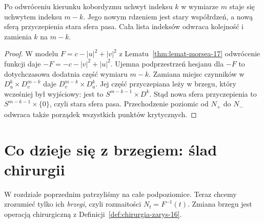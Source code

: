 \begin{twierdzenie}
\label{thm:dualny-uchwyt-18}
Po odwróceniu kierunku kobordyzmu uchwyt
indeksu $k$ w wymiarze $m$ staje się uchwytem
indeksu $m-k$. Jego nowym rdzeniem jest stary
współrdzeń, a nową sferą przyczepienia stara
sfera pasa. Cała lista indeksów odwraca kolejność
i zamienia $k$ na $m-k$.
\end{twierdzenie}
\begin{proof}
W modelu $F=c-|u|^2+|v|^2$ z
Lematu~\ref{thm:lemat-morsea-17}
odwrócenie funkcji daje
$-F=-c-|v|^2+|u|^2$.
Ujemna podprzestrzeń hesjanu dla $-F$
to dotychczasowa dodatnia część wymiaru
$m-k$. Zamiana miejsc czynników w
$D^k_u\times D^{m-k}_v$ daje
$D^{m-k}_v\times D^k_u$.
Jej część przyczepiana leży w brzegu,
który wcześniej był wyjściowy:
jest to $S^{m-k-1}\times D^k$.
Stąd nowa sfera przyczepienia to
$S^{m-k-1}\times\{0\}$, czyli stara
sfera pasa. Przechodzenie poziomic
od $N_+$ do $N_-$ odwraca także
porządek wszystkich punktów krytycznych.
\end{proof}

\section{Co dzieje się z brzegiem: ślad chirurgii}
\label{sec:slad-chirurgii-18}

W rozdziale poprzednim patrzyliśmy na całe
podpoziomice. Teraz chcemy zrozumieć tylko
ich \emph{brzegi}, czyli rozmaitości $N_t=F^{-1}(t)$.
Zmiana brzegu jest operacją chirurgiczną
z Definicji~\ref{def:chirurgia-zarys-16}.

